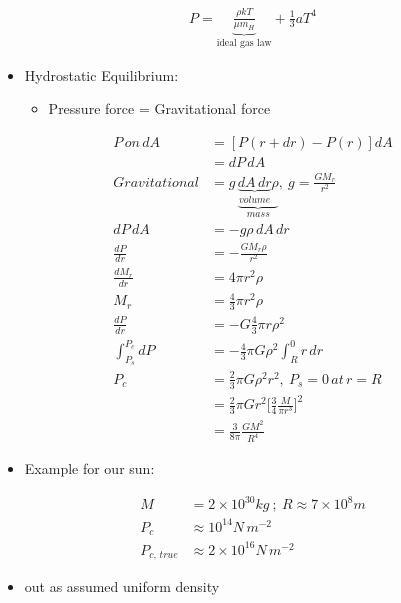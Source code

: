 \documentclass[a4paper,11pt,normalem]{article}
\begin{document}
\section{}
\begin{align}
    P = \underbrace{\frac{\rho kT}{\mu m_H}}_{\text{ideal gas law}} + \frac{1}{3}aT^4
\end{align}
\begin{itemize}
    \item Hydrostatic Equilibrium:
        \begin{itemize}
            \item Pressure force = Gravitational force
        \end{itemize}
\end{itemize}
\begin{align}
    P\,on\,dA &= [P(r + dr) - P(r)]dA \\
    &= dP\,dA \\
    Gravitational &= g\,\underbrace{\underbrace{dA\, dr}_{volume} \rho}_{mass},~ g = \frac{GM_r}{r^2} \\
    dP\,dA &= -g\rho\, dA\, dr \\
    \frac{dP}{dr} &= -\frac{GM_r \rho}{r^2} \\
    \frac{dM_r}{dr} &= 4\pi r^2 \rho \\
    M_r &= \frac{4}{3}\pi r^2 \rho \\
    \frac{dP}{dr} &= -G \frac{4}{3}\pi r \rho^2 \\
    \int_{P_s}^{P_c} dP &= -\frac{4}{3}\pi G \rho^2 \int_{R}^{0} r\,dr \\
    P_c &= \frac{2}{3}\pi G \rho^2 r^2,~ P_s = 0 \,at\, r = R\\
    &= \frac{2}{3}\pi Gr^2 \Big[\frac{3}{4}\frac{M}{\pi r^3}\Big]^2 \\
    &= \frac{3}{8\pi}\frac{GM^2}{R^4}
\end{align}
\begin{itemize}
    \item Example for our sun:
\end{itemize}
\begin{align}
    M &= 2\times10^{30} kg ~;~ R \approx 7\times10^8 m \\
    P_c &\approx 10^{14} N\,m^{-2} \\
    P_{c,\, true} &\approx 2\times10^{16} N\,m^{-2}
\end{align}

\begin{itemize}
    \item out as assumed uniform density
\end{itemize}
\end{document}
